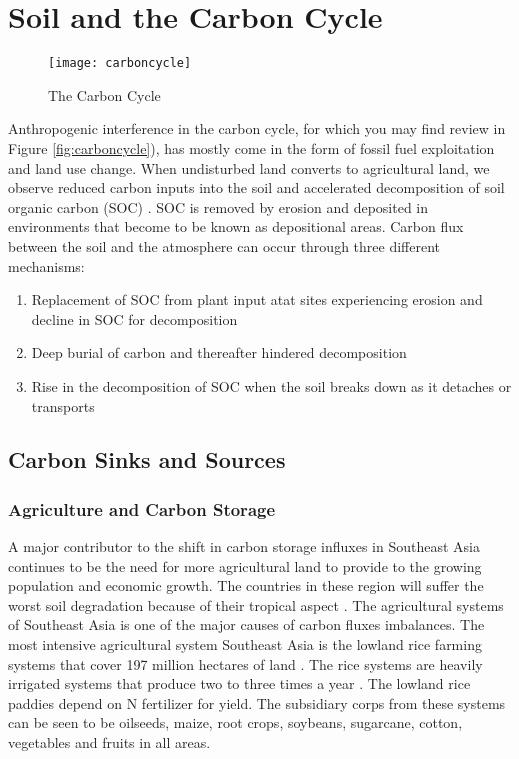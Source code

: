 \section{Soil and the Carbon Cycle}

\begin{figure}
\texttt{[image: carboncycle]}
\caption{The Carbon Cycle}
\label{fig:carbon cycle}
\end{figure}

Anthropogenic interference in the carbon cycle, for which you may find review in Figure \ref{fig:carboncycle}), has mostly come in the form of fossil fuel exploitation and land use change. When undisturbed land converts to agricultural land, we observe reduced carbon inputs into the soil and accelerated decomposition of soil organic carbon (SOC) \citep{van2007impact}. SOC is removed by erosion and deposited in environments that become to be known as depositional areas. Carbon flux between the soil and the atmosphere can occur through three different mechanisms: 

\begin{enumerate}
  \item Replacement of SOC from plant input atat sites experiencing erosion and decline in SOC for decomposition
  \item Deep burial of carbon and thereafter hindered decomposition
  \item Rise in the decomposition of SOC when the soil breaks down as it detaches or transports
\end{enumerate}

\subsection{Carbon Sinks and Sources}

\subsubsection{Agriculture and Carbon Storage}

A major contributor to the shift in carbon storage influxes in Southeast Asia continues to be the need for more agricultural land to provide to the growing population and economic growth. The countries in these region will suffer the worst soil degradation because of their tropical aspect \citep{scherr1999soil}. The agricultural systems of Southeast Asia is one of the major causes of carbon fluxes imbalances. The most intensive agricultural system Southeast Asia is the lowland rice farming systems that cover 197 million hectares of land \citep{dixon2001nonalcoholic}. The rice systems are heavily irrigated systems that produce two to three times a year \citep{cassman1995extrapolating}. The lowland rice paddies depend on N fertilizer for yield. The subsidiary corps from these systems can be seen to be oilseeds, maize, root crops, soybeans, sugarcane, cotton, vegetables and fruits in all areas.

